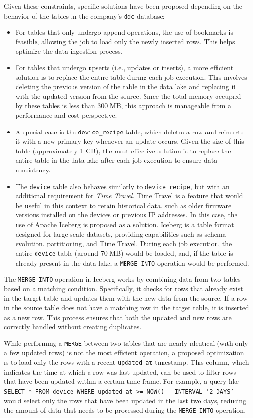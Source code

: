 Given these constraints, specific solutions have been proposed depending on the behavior of the tables in the company's \texttt{ddc} database:
\begin{itemize}
    \item For tables that only undergo append operations, the use of bookmarks is feasible, allowing the job to load only the newly inserted rows. This helps optimize the data ingestion process.
    \item For tables that undergo upserts (i.e., updates or inserts), a more efficient solution is to replace the entire table during each job execution. This involves deleting the previous version of the table in the data lake and replacing it with the updated version from the source. Since the total memory occupied by these tables is less than 300 MB, this approach is manageable from a performance and cost perspective.
    \item A special case is the \texttt{device\_recipe} table, which deletes a row and reinserts it with a new primary key whenever an update occurs. Given the size of this table (approximately 1 GB), the most effective solution is to replace the entire table in the data lake after each job execution to ensure data consistency.
    \item The \texttt{device} table also behaves similarly to \texttt{device\_recipe}, but with an additional requirement for \textit{Time Travel}. Time Travel is a feature that would be useful in this context to retain historical data, such as older firmware versions installed on the devices or previous IP addresses. In this case, the use of Apache Iceberg is proposed as a solution. Iceberg is a table format designed for large-scale datasets, providing capabilities such as schema evolution, partitioning, and Time Travel. During each job execution, the entire \texttt{device} table (around 70 MB) would be loaded, and, if the table is already present in the data lake, a \texttt{MERGE INTO} operation would be performed.
\end{itemize}
The \texttt{MERGE INTO} operation in Iceberg works by combining data from two tables based on a matching condition. Specifically, it checks for rows that already exist in the target table and updates them with the new data from the source. If a row in the source table does not have a matching row in the target table, it is inserted as a new row. This process ensures that both the updated and new rows are correctly handled without creating duplicates.

While performing a \texttt{MERGE} between two tables that are nearly identical (with only a few updated rows) is not the most efficient operation, a proposed optimization is to load only the rows with a recent \texttt{updated\_at} timestamp. This column, which indicates the time at which a row was last updated, can be used to filter rows that have been updated within a certain time frame. For example, a query like \texttt{SELECT * FROM device WHERE updated\_at >= NOW() - INTERVAL '2 DAYS'} would select only the rows that have been updated in the last two days, reducing the amount of data that needs to be processed during the \texttt{MERGE INTO} operation.

